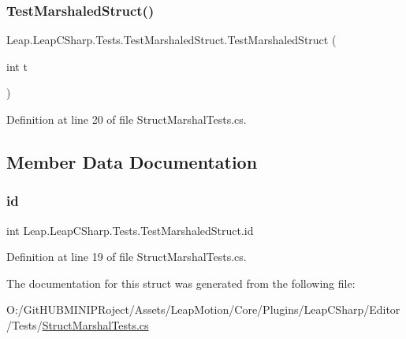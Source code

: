 \subsubsection{\texorpdfstring{TestMarshaledStruct()}{TestMarshaledStruct()}}
{\footnotesize\ttfamily Leap.\+Leap\+C\+Sharp.\+Tests.\+Test\+Marshaled\+Struct.\+Test\+Marshaled\+Struct (\begin{DoxyParamCaption}\item[{int}]{t }\end{DoxyParamCaption})}



Definition at line 20 of file Struct\+Marshal\+Tests.\+cs.



\subsection{Member Data Documentation}
\mbox{\label{struct_leap_1_1_leap_c_sharp_1_1_tests_1_1_test_marshaled_struct_a46b6e7994957bd6b633533479298e2b1}} 
\subsubsection{\texorpdfstring{id}{id}}
{\footnotesize\ttfamily int Leap.\+Leap\+C\+Sharp.\+Tests.\+Test\+Marshaled\+Struct.\+id}



Definition at line 19 of file Struct\+Marshal\+Tests.\+cs.



The documentation for this struct was generated from the following file\+:\begin{DoxyCompactItemize}
\item 
O\+:/\+Git\+H\+U\+B\+M\+I\+N\+I\+P\+Roject/\+Assets/\+Leap\+Motion/\+Core/\+Plugins/\+Leap\+C\+Sharp/\+Editor/\+Tests/\mbox{\hyperlink{_struct_marshal_tests_8cs}{Struct\+Marshal\+Tests.\+cs}}\end{DoxyCompactItemize}
